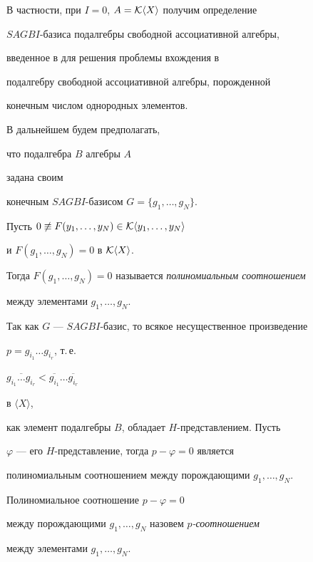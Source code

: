 В частности, при $I=0$, $A={\cal K}\langle X\rangle$  получим определение


$SAGBI$-базиса подалгебры свободной ассоциативной алгебры,


введенное в \cite{iyy2} для решения проблемы вхождения в


подалгебру свободной ассоциативной алгебры, порожденной


конечным числом однородных элементов.








В дальнейшем будем предполагать,


что  подалгебра $B$ алгебры $A$


задана своим


конечным $SAGBI$-базисом $G=\lbrace g_{1},\dotsc,g_{N}\rbrace$.





\begin{defn}


Пусть $0\not\equiv F(y_{1},\dotsc,y_{N})\in


{\cal K}\langle y_{1},\dotsc,y_{N}\rangle$


и $F(g_{1},\dotsc,g_{N})=0$ в ${\cal K}\langle X\rangle$.


Тогда $F(g_{1},\dotsc,g_{N})=0$ называется {\it полиномиальным соотношением}


между элементами $g_{1},\dotsc,g_{N}$.


\end{defn}





Так как $G$ --- $SAGBI$-базис, то всякое несущественное произведение


$p=g_{i_{1}}\dotsc g_{i_{r}}$, т.\,е.


$\overline{g_{i_{1}}\dotsc g_{i_{r}}}<


\overline{g_{i_{1}}}\dotsc\overline{g_{i_{r}}}$


в $\langle X\rangle$,


как элемент подалгебры $B$, обладает $H$-представлением. Пусть


$\varphi$ --- его $H$-представление, тогда $p-\varphi=0$ является


полиномиальным соотношением между порождающими $g_{1},\dotsc,g_{N}$.





\begin{defn}


Полиномиальное соотношение $p-\varphi=0$


между порождающими $g_{1},\dotsc,g_{N}$ назовем {\it $p$-соотношением}


между элементами $g_{1},\dotsc,g_{N}$.


\end{defn}





